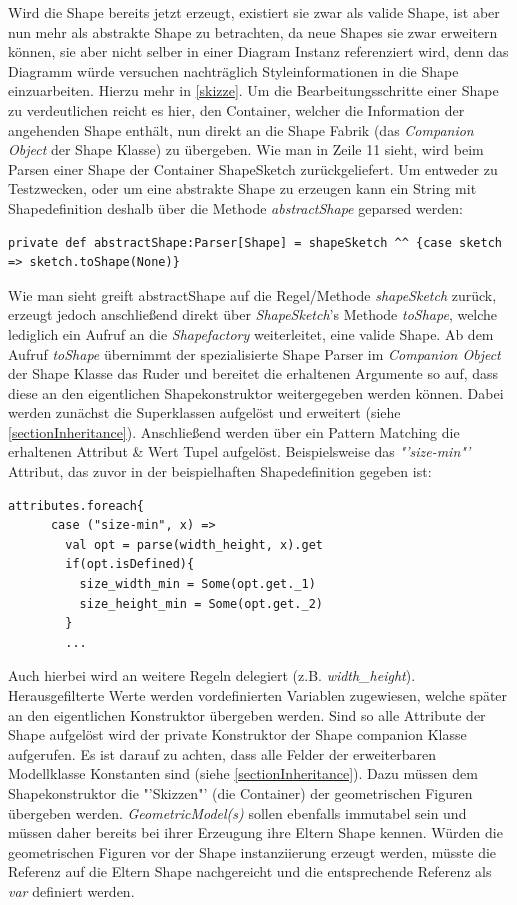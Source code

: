 Wird die Shape bereits jetzt erzeugt, existiert sie zwar als valide Shape, ist aber nun mehr als abstrakte Shape zu betrachten, da neue Shapes sie zwar erweitern können, sie aber nicht selber in einer Diagram Instanz referenziert wird, denn das Diagramm würde versuchen nachträglich Styleinformationen in die Shape einzuarbeiten. Hierzu mehr in \ref{skizze}. Um die Bearbeitungsschritte einer Shape zu verdeutlichen reicht es hier, den Container, welcher die Information der angehenden Shape enthält, nun direkt an die Shape Fabrik (das \textit{Companion Object} der Shape Klasse) zu übergeben. Wie man in Zeile 11 sieht, wird beim Parsen einer Shape der Container ShapeSketch zurückgeliefert.
Um entweder zu Testzwecken, oder um eine abstrakte Shape zu erzeugen kann ein String mit Shapedefinition deshalb über die Methode \textit{abstractShape} geparsed werden:
\begin{lstlisting}[style=scala]
private def abstractShape:Parser[Shape] = shapeSketch ^^ {case sketch => sketch.toShape(None)}
\end{lstlisting}Wie man sieht greift abstractShape auf die Regel/Methode \textit{shapeSketch} zurück, erzeugt jedoch anschließend direkt über \textit{ShapeSketch}'s Methode \textit{toShape}, welche lediglich ein Aufruf an die \textit{Shapefactory} weiterleitet, eine valide Shape. Ab dem Aufruf \textit{toShape} übernimmt der spezialisierte Shape Parser im \textit{Companion Object} der Shape Klasse das Ruder und bereitet die erhaltenen Argumente so auf, dass diese an den eigentlichen Shapekonstruktor weitergegeben werden können. Dabei werden zunächst die Superklassen aufgelöst und erweitert (siehe \ref{sectionInheritance}). Anschließend werden über ein Pattern Matching die erhaltenen Attribut \& Wert Tupel aufgelöst. Beispielsweise das \textit{"'size-min"'} Attribut, das zuvor in der beispielhaften Shapedefinition gegeben ist:
\begin{lstlisting}[style=scala]
attributes.foreach{
      case ("size-min", x) =>
        val opt = parse(width_height, x).get
        if(opt.isDefined){
          size_width_min = Some(opt.get._1)
          size_height_min = Some(opt.get._2)
        }
        ...
\end{lstlisting}Auch hierbei wird an weitere Regeln delegiert (z.B. \textit{width\_height}). Herausgefilterte Werte werden vordefinierten Variablen zugewiesen, welche später an den eigentlichen Konstruktor übergeben werden. Sind so alle Attribute der Shape aufgelöst wird der private Konstruktor der Shape companion Klasse aufgerufen. Es ist darauf zu achten, dass alle Felder der erweiterbaren Modellklasse Konstanten sind (siehe \ref{sectionInheritance}). Dazu müssen dem Shapekonstruktor die "'Skizzen"' (die Container) der geometrischen Figuren übergeben werden. \textit{GeometricModel(s)} sollen ebenfalls immutabel sein und müssen daher bereits bei ihrer Erzeugung ihre Eltern Shape kennen. Würden die geometrischen Figuren vor der Shape instanziierung erzeugt werden, müsste die Referenz auf die Eltern Shape nachgereicht  und die entsprechende Referenz als \textit{var} definiert werden.
